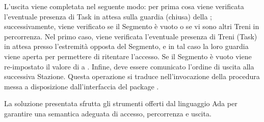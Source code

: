 	L'uscita viene completata nel seguente modo: per prima cosa viene verificata l'eventuale presenza di Task in attesa sulla guardia (chiusa) della  ; successivamente, viene verificato se il Segmento è vuoto o se vi sono altri Treni in percorrenza. Nel primo caso, viene verificata l'eventuale presenza di Treni (Task) in attesa presso l'estremità opposta del Segmento, e in tal caso la loro guardia viene aperta per permettere di ritentare l'accesso. Se il Segmento è vuoto viene re-impostato il valore di  a .	
	Infine, deve essere comunicato l'ordine di uscita alla successiva Stazione. Questa operazione si traduce nell'invocazione della procedura  messa a disposizione dall'interfaccia  del package . 

La soluzione presentata sfrutta gli strumenti offerti dal linguaggio Ada per garantire una semantica adeguata di accesso, percorrenza e uscita.
